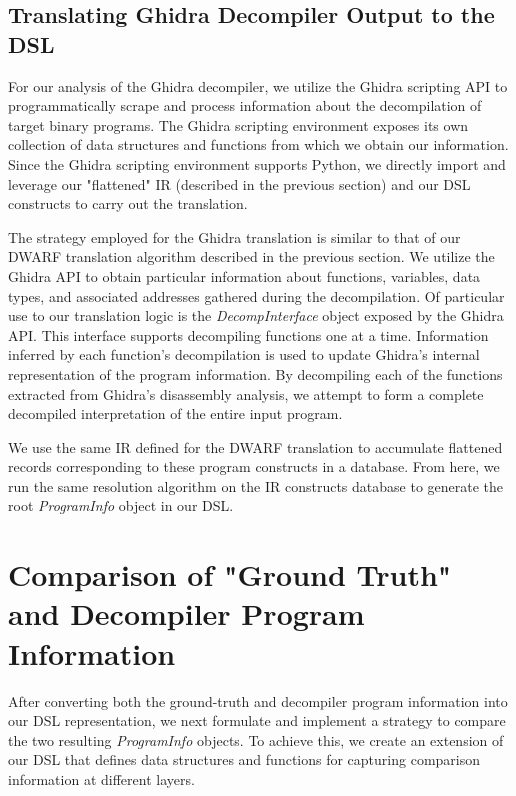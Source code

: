\subsection{Translating Ghidra Decompiler Output to the DSL}

For our analysis of the Ghidra decompiler, we utilize the Ghidra scripting API to programmatically scrape and process information about the decompilation of target binary programs. The Ghidra scripting environment exposes its own collection of data structures and functions from which we obtain our information. Since the Ghidra scripting environment supports Python, we directly import and leverage our "flattened" IR (described in the previous section) and our DSL constructs to carry out the translation.

The strategy employed for the Ghidra translation is similar to that of our DWARF translation algorithm described in the previous section. We utilize the Ghidra API to obtain particular information about functions, variables, data types, and associated addresses gathered during the decompilation. Of particular use to our translation logic is the \emph{DecompInterface} object exposed by the Ghidra API. This interface supports decompiling functions one at a time. Information inferred by each function's decompilation is used to update Ghidra's internal representation of the program information. By decompiling each of the functions extracted from Ghidra's disassembly analysis, we attempt to form a complete decompiled interpretation of the entire input program.

We use the same IR defined for the DWARF translation to accumulate flattened records corresponding to these program constructs in a database. From here, we run the same resolution algorithm on the IR constructs database to generate the root \emph{ProgramInfo} object in our DSL.

\section{Comparison of "Ground Truth" and Decompiler Program Information}

After converting both the ground-truth and decompiler program information into our DSL representation, we next formulate and implement a strategy to compare the two resulting \emph{ProgramInfo} objects. To achieve this, we create an extension of our DSL that defines data structures and functions for capturing comparison information at different layers.

